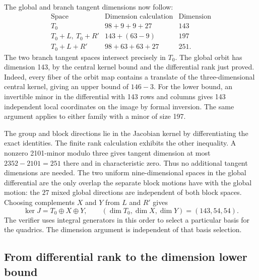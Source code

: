 \documentclass[11pt]{amsart}
\begin{document}
The global and branch tangent dimensions now follow:
\[
\begin{array}{c|c|c}
\text{Space} & \text{Dimension calculation} & \text{Dimension}\\ \hline
T_0 & 98+9+9+27 & 143\\
T_0+L,\ T_0+R' & 143+(63-9) & 197\\
T_0+L+R' & 98+63+63+27 & 251 .
\end{array}
\]
The two branch tangent spaces intersect precisely in $T_0$.
The global orbit has dimension 143, by the central kernel bound and
the differential rank just proved. Indeed, every fiber of the orbit
map contains a translate of the three-dimensional central kernel,
giving an upper bound of $146-3$. For the lower bound, an invertible
minor in the differential with 143 rows and columns gives 143
independent local coordinates on the image by formal inversion.
The same argument applies to either family with a minor of size 197.

The group and block directions lie in the Jacobian kernel by
differentiating the exact identities. The finite rank calculation
exhibits the other inequality. A nonzero 2101-minor modulo three
gives tangent dimension at most $2352-2101=251$ there and in
characteristic zero. Thus no additional tangent dimensions are
needed. The two uniform nine-dimensional spaces in the global
differential are the only overlap the separate block motions have
with the global motion: the $27$ mixed global directions are
independent of both block spaces.
Choosing complements $X$ and $Y$ from $L$ and $R'$ gives
\begin{equation}\label{eq:split}
 \ker J=T_0\oplus X\oplus Y,
 \qquad (\dim T_0,\dim X,\dim Y)=(143,54,54).
\end{equation}
The verifier uses integral generators in this order to select a particular
basis for the quadrics. The dimension argument is independent of that
basis selection.

\subsection{From differential rank to the dimension lower bound}
\end{document}
